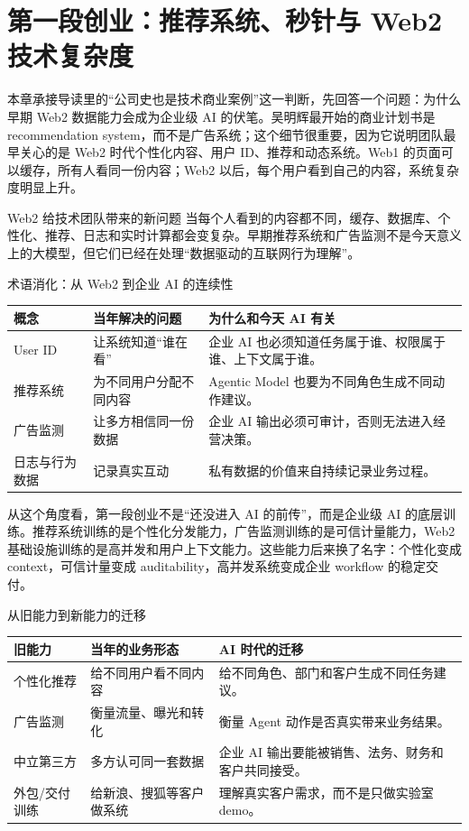 \section{第一段创业：推荐系统、秒针与 Web2 技术复杂度}

本章承接导读里的“公司史也是技术商业案例”这一判断，先回答一个问题：为什么早期 Web2 数据能力会成为企业级 AI 的伏笔。吴明辉最开始的商业计划书是 recommendation system，而不是广告系统；这个细节很重要，因为它说明团队最早关心的是 Web2 时代个性化内容、用户 ID、推荐和动态系统。Web1 的页面可以缓存，所有人看同一份内容；Web2 以后，每个用户看到自己的内容，系统复杂度明显上升。

\begin{importantbox}{Web2 给技术团队带来的新问题}
当每个人看到的内容都不同，缓存、数据库、个性化、推荐、日志和实时计算都会变复杂。早期推荐系统和广告监测不是今天意义上的大模型，但它们已经在处理“数据驱动的互联网行为理解”。
\end{importantbox}

\begin{knowledgebox}{术语消化：从 Web2 到企业 AI 的连续性}
\begin{tabularx}{\textwidth}{p{}p{}X}
\toprule
概念 & 当年解决的问题 & 为什么和今天 AI 有关 \\
\midrule
User ID & 让系统知道“谁在看” & 企业 AI 也必须知道任务属于谁、权限属于谁、上下文属于谁。 \\
推荐系统 & 为不同用户分配不同内容 & Agentic Model 也要为不同角色生成不同动作建议。 \\
广告监测 & 让多方相信同一份数据 & 企业 AI 输出必须可审计，否则无法进入经营决策。 \\
日志与行为数据 & 记录真实互动 & 私有数据的价值来自持续记录业务过程。 \\
\bottomrule
\end{tabularx}
\end{knowledgebox}

从这个角度看，第一段创业不是“还没进入 AI 的前传”，而是企业级 AI 的底层训练。推荐系统训练的是个性化分发能力，广告监测训练的是可信计量能力，Web2 基础设施训练的是高并发和用户上下文能力。这些能力后来换了名字：个性化变成 context，可信计量变成 auditability，高并发系统变成企业 workflow 的稳定交付。

\begin{knowledgebox}{从旧能力到新能力的迁移}
\begin{tabularx}{\textwidth}{p{}p{}X}
\toprule
旧能力 & 当年的业务形态 & AI 时代的迁移 \\
\midrule
个性化推荐 & 给不同用户看不同内容 & 给不同角色、部门和客户生成不同任务建议。 \\
广告监测 & 衡量流量、曝光和转化 & 衡量 Agent 动作是否真实带来业务结果。 \\
中立第三方 & 多方认可同一套数据 & 企业 AI 输出要能被销售、法务、财务和客户共同接受。 \\
外包/交付训练 & 给新浪、搜狐等客户做系统 & 理解真实客户需求，而不是只做实验室 demo。 \\
\bottomrule
\end{tabularx}
\end{knowledgebox}

